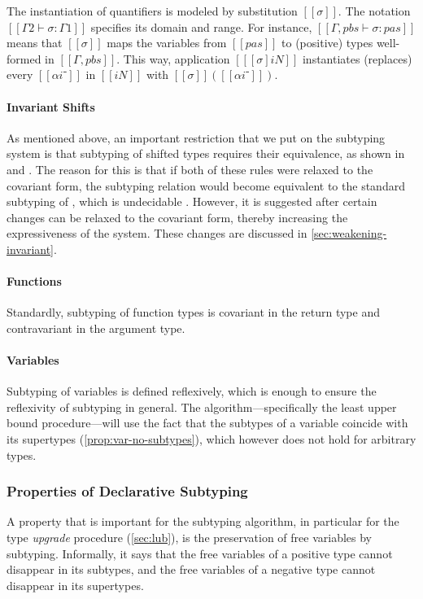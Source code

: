 The instantiation of quantifiers is modeled by substitution $[[σ]]$.
The notation $[[Γ2 ⊢ σ : Γ1]]$ specifies its domain and range.
For instance, $[[Γ, pbs ⊢ σ : {pas}]]$ means that 
$[[σ]]$ maps the variables from $[[pas]]$ to (positive) types
well-formed in $[[Γ, pbs]]$.
This way, application $[[ [σ]iN ]]$ instantiates (replaces) every
$[[αi⁻]]$ in $[[iN]]$ with $[[σ]]([[αi⁻]])$.

\paragraph{Invariant Shifts}
As mentioned above, an important restriction that we put on the subtyping system
is that subtyping of shifted types requires their equivalence, as shown in
 and . The
reason for this is that if both of these rules were relaxed to the covariant
form, the subtyping relation would become equivalent to the standard subtyping
of \systemf, which is undecidable \cite{tiuryn-urzczyn-96}. However, it is
suggested after certain changes  can be
relaxed to the covariant form, thereby increasing the expressiveness of the
system. These changes are discussed in \cref{sec:weakening-invariant}.

\paragraph{Functions}
Standardly, subtyping of function types is covariant in the return type
and contravariant in the argument type.

\paragraph{Variables}
Subtyping of variables is defined reflexively, which is enough to ensure the
reflexivity of subtyping in general. The algorithm---specifically the least
upper bound procedure---will use the fact that the subtypes of a variable
coincide with its supertypes (\cref{prop:var-no-subtypes}),
which however does not hold for arbitrary types.

\subsubsection{Properties of Declarative Subtyping}
\label{sec:decl-subtyping-properties}

A property that is important for the subtyping algorithm, 
in particular for the type \emph{upgrade} procedure (\cref{sec:lub}),
is the preservation of free variables by subtyping.
Informally, it says that the free variables
of a positive type cannot disappear in its subtypes,
and the free variables of a negative type
cannot disappear in its supertypes.

